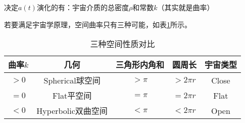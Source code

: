 \par 
决定$a(t)$演化的有：宇宙介质的总密度$\rho$和常数$k$（其实就是曲率）
\par
若要满足宇宙学原理，空间曲率只有三种可能，如表\ref{table:1}所示。
\begin{table}[!h]
	\tiny
	\centering
	\begin{tabular}{|c|c|c|c|c|}
		\hline
		曲率$k$ & 几何             & 三角形内角和 & 圆周长 & 宇宙类型  \\ \hline
		$> 0$   & Spherical球空间   & $> \pi$      & $> 2 \pi r$  & Close \\ \hline
		$= 0$   & Flat平空间        & $= \pi$      & $= 2 \pi r$  & Flat  \\ \hline
		$< 0$   & Hyperbolic双曲空间 & $< \pi$      & $< 2 \pi r$  & Open  \\ \hline
	\end{tabular}
	\caption{三种空间性质对比}
	\label{table:1}
\end{table}

